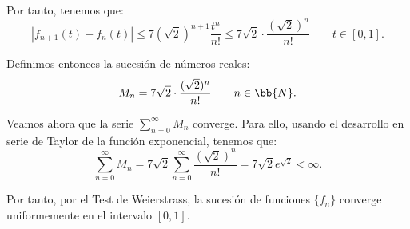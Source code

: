 \documentclass[12pt]{article}
\begin{document}
\begin{ejercicio}
        Por tanto, tenemos que:
        \[
            |f_{n+1}(t)-f_n(t)|\leq 7(\sqrt{2})^{n+1}\frac{t^{n}}{n!}\leq
            7\sqrt{2}\cdot \frac{(\sqrt{2})^{n}}{n!}\qquad t\in [0,1].
        \]

        Definimos entonces la sucesión de números reales:
        \[
            M_n = 7\sqrt{2}\cdot \frac{(\sqrt{2})^{n}}{n!}\qquad n\in \bb{N}.
        \]

        Veamos ahora que la serie $\sum\limits_{n=0}^{\infty} M_n$ converge. Para ello, usando el desarrollo en serie de Taylor de la función exponencial, tenemos que:
        \[
            \sum_{n=0}^{\infty} M_n = 7\sqrt{2}\sum_{n=0}^{\infty} \frac{(\sqrt{2})^{n}}{n!} = 7\sqrt{2}e^{\sqrt{2}} < \infty.
        \]

        Por tanto, por el Test de Weierstrass, la sucesión de funciones $\{f_n\}$ converge uniformemente en el intervalo $[0,1]$.
    \end{ejercicio}
\end{document}
